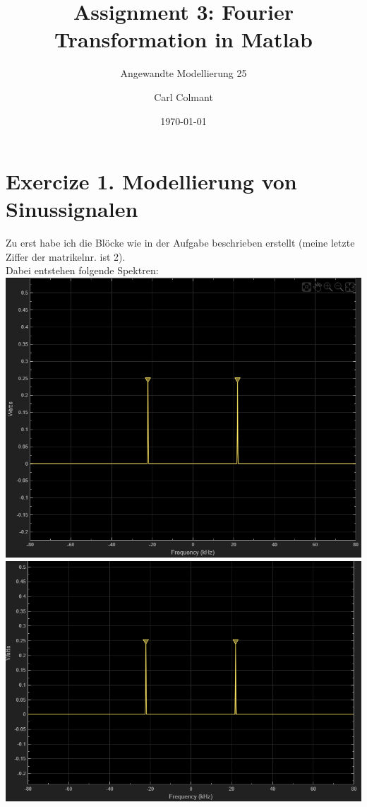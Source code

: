 \documentclass{scrartcl}
\title{Assignment 3: Fourier Transformation in Matlab}
\subtitle{Angewandte Modellierung 25}
\author{Carl Colmant}
\date{\today}
\begin{document}
\maketitle
\newpage
\section*{Exercize 1. Modellierung von Sinussignalen}
Zu erst habe ich die Blöcke wie in der Aufgabe beschrieben erstellt (meine letzte Ziffer der matrikelnr. ist 2).\\
Dabei entstehen folgende Spektren:\\
\includegraphics[scale=0.5]{spectrum.png} \\
\includegraphics[scale=0.5]{spectrum1.png} \\
\end{document}
